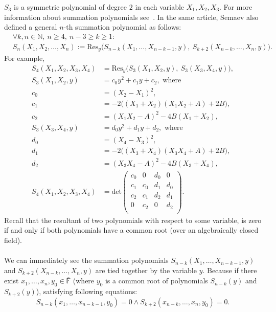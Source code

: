 \documentclass[thesis=M,english]{FITthesis}[2012/10/20]
\theoremstyle{remark}
\theoremstyle{definition}
\begin{document}
$S_3$ is a symmetric polynomial of degree $2$ in each variable $X_1,X_2,X_3$. For more information about summation polynomials see~\cite{semaev04}. In the same article, Semaev also defined a general $n$-th summation polynomial as follows:
\begin{align*}
&\forall k,n \in \mathbb{N},\ n \geq 4,\ n-3\geq k \geq 1:\\
&S_n(X_1,X_2,\ldots, X_n) := \text{Res}_y\bigg(S_{n-k}(X_1,\ldots,X_{n-k-1},y),\ S_{k+2}(X_{n-k},\ldots,X_n,y)\bigg).
\end{align*}
For example, 
\begin{align*}
S_4(X_1,X_2,X_3,X_4) &= \text{Res}_y\bigg(S_3(X_1,X_2,y),\ S_3(X_3,X_4,y)\bigg), \\
S_3(X_1,X_2,y) &= c_0y^2 + c_1y + c_2, \text{ where } \\
c_0 &= (X_2-X_1)^2,\\ 
c_1 &= -2\bigg((X_1+X_2)(X_1X_2 + A) + 2B\bigg),\\
c_2 &=  (X_1X_2-A)^2 - 4B(X_1+X_2),  \\
S_3(X_3,X_4,y) &= d_0y^2 + d_1y + d_2, \text{ where } \\
d_0 &= (X_4-X_3)^2,\\ 
d_1 &= -2\bigg((X_3+X_4)(X_3X_4 + A) + 2B\bigg),\\
d_2 &=  (X_3X_4-A)^2 - 4B(X_3+X_4), \\
S_4(X_1,X_2,X_3,X_4) &= \text{det}
\begin{pmatrix}
c_0 & 0 & d_0 & 0 \\
c_1 & c_0  & d_1 & d_0  \\
c_2 & c_1 &  d_2 & d_1 \\
 0 & c_2 & 0 & d_2 \\
\end{pmatrix}.
\end{align*}
\label{resExample}
\noindent Recall that the resultant of two polynomials with respect to some variable, is zero if and only if both polynomials have a common root (over an algebraically closed field). 
 \\ \\
\noindent We can immediately see the summation polynomials $S_{n-k}(X_1,\ldots,X_{n-k-1},y)$ and $S_{k+2}(X_{n-k},\ldots,X_n,y)$ are tied together by the variable $y$. Because if there exist $x_1,\ldots, x_n, y_0 \in \overline{\mathbb{F}}$ (where $y_0$ is a common root of polynomials $S_{n-k}(y)$ and $S_{k+2}(y)$), satisfying following equations:
$$
S_{n-k}(x_1,\ldots,x_{n-k-1}, y_0) = 0 \land S_{k+2}(x_{n-k},\ldots,x_{n}, y_0) = 0.$$
\end{document}
